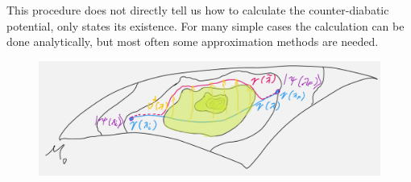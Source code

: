 This procedure does not directly tell us how to calculate the counter-diabatic potential, only states its existence. For many simple cases the calculation can be done analytically, but most often some approximation methods are needed.


\begin{figure}[h]
    \centering
    \includegraphics[width=\textwidth]{../img/counterdiabaticPotential.png}
\end{figure}




